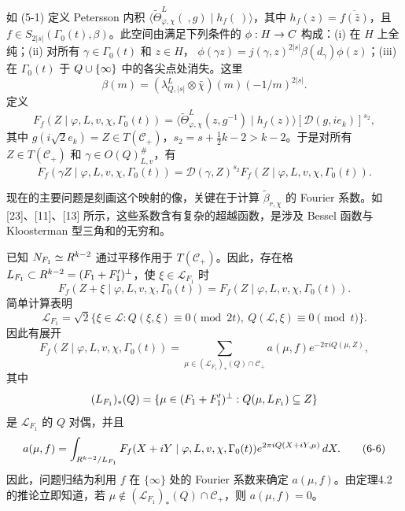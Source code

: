 如 (5-1) 定义 Petersson 内积
$\langle\widetilde\Theta_{\varphi,\chi}^L(\ ,g)\mid h_f(\ )\rangle$，其中
$h_f(z)=\overline{f(\bar z)}$，且 $f\in S_{2|s|}(\Gamma_0(t),\beta)$。此空间由满足下列条件的 $\phi:H\to C$ 构成：(i) 在 $H$ 上全纯；(ii) 对所有 $\gamma\in\Gamma_0(t)$ 和 $z\in H$，
$\phi(\gamma z)=j(\gamma,z)^{2|s|}\beta(d_\gamma)\phi(z)$；(iii) 在 $\Gamma_0(t)$ 于 $Q\cup\{\infty\}$ 中的各尖点处消失。这里
\[
 \beta(m)=(\lambda_{Q,|s|}^L\otimes\bar\chi)(m)(-1/m)^{2|s|}.
\]
定义
\begin{equation}
 F_f(Z\mid\varphi,L,v,\chi,\Gamma_0(t))
 =\langle\widetilde\Theta_{\varphi,\chi}^L(z,g^{-1})\mid h_f(z)\rangle
 [\mathcal D(g,ie_k)]^{s_2},\tag{6-4}
\end{equation}
其中 $g(i\sqrt2e_k)=Z\in T(\mathcal C_+)$，$s_2=s+\tfrac12k-2>k-2$。于是对所有 $Z\in T(\mathcal C_+)$ 和 $\gamma\in O(Q)_{L,v}^\#$，有
\[
 F_f(\gamma Z\mid\varphi,L,v,\chi,\Gamma_0(t))
 =\mathcal D(\gamma,Z)^{s_2}F_f(Z\mid\varphi,L,v,\chi,\Gamma_0(t)).
\]

现在的主要问题是刻画这个映射的像，关键在于计算 $\widetilde\beta_{r,\chi}$ 的 Fourier 系数。如 [23]、[11]、[13] 所示，这些系数含有复杂的超越函数，是涉及 Bessel 函数与 Kloosterman 型三角和的无穷和。

已知 $N_{F_1}\simeq R^{k-2}$ 通过平移作用于 $T(\mathcal C_+)$。因此，存在格
$L_{F_1}\subset R^{k-2}=(F_1+F_1')^\perp$，使 $\xi\in\mathcal L_{F_1}$ 时
\[
 F_f(Z+\xi\mid\varphi,L,v,\chi,\Gamma_0(t))
 =F_f(Z\mid\varphi,L,v,\chi,\Gamma_0(t)).
\]
简单计算表明
\[
 \mathcal L_{F_1}=\sqrt2\{\xi\in\mathcal L:Q(\xi,\xi)\equiv0\pmod{2t},\
 Q(\mathcal L,\xi)\equiv0\pmod t\}.
\]
因此有展开
\begin{equation}
 F_f(Z\mid\varphi,L,v,\chi,\Gamma_0(t))
 =\sum_{\mu\in(\mathcal L_{F_1})_*(Q)\cap\mathcal C_+}
 a(\mu,f)e^{-2\pi iQ(\mu,Z)},\tag{6-5}
\end{equation}
其中
\[
 (L_{F_1})_*(Q)=\{\mu\in(F_1+F_1')^\perp:Q(\mu,L_{F_1})\subseteq Z\}
\]
是 $\mathcal L_{F_1}$ 的 $Q$ 对偶，并且
\begin{equation}
 a(\mu,f)=\int_{R^{k-2}/L_{F_1}}
 F_f(X+iY\mid\varphi,L,v,\chi,\Gamma_0(t))
 e^{2\pi iQ(X+iY,\mu)}\,dX.\tag{6-6}
\end{equation}
因此，问题归结为利用 $f$ 在 $\{\infty\}$ 处的 Fourier 系数来确定 $a(\mu,f)$。由定理4.2的推论立即知道，若
$\mu\notin(\mathcal L_{F_1})_*(Q)\cap\mathcal C_+$，则 $a(\mu,f)=0$。

